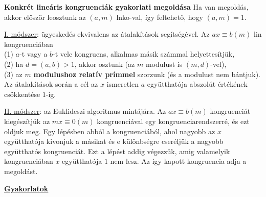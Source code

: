 \documentclass[a4paper, 12pt]{article}
\newcommand{\ul}{\underline}
\begin{document}
{\bf Konkrét lineáris kongruenciák gyakorlati megoldása} Ha van megoldás,
akkor először leosztunk az $(a,m)$ lnko-val, így feltehető, hogy $(a,m)=1$.

\ul{I. módszer}:
ügyeskedés ekvivalens az átalakítások segítségével. Az $ax\equiv b(m)$ lin
kongruenciában\\
(1) $a$-t vagy a $b$-t vele kongruens, alkalmas másik számmal helyettesítjük,\\
(2) ha $d=(a,b)>1$, akkor osztunk (az $m$ modulust is $(m,d)$-vel),\\
(3) az $m$ {\bf modulushoz relatív prímmel} szorzunk (és a
modulust nem bántjuk).\\
Az átalakítások során a cél az $x$ ismeretlen $a$
együtthatója abszolút értékének csökkentése $1$-ig.

\ul{II. módszer}: az Euklideszi algoritmus mintájára. Az $ax\equiv b(m)$
kongruenciát kiegészítjük az $mx\equiv 0(m)$ kongruenciával egy
kongruenciarendszerré, és ezt oldjuk meg. Egy lépésben abból a
kongruenciából, ahol nagyobb az $x$ együtthatója kivonjuk a másikat és e
különbségre cseréljük a nagyobb együtthatós kongruenciát. Ezt a lépést
addig végezzük, amig valamelyik kongruenciában $x$ együtthatója $1$ nem
lesz. Az így kapott kongruencia adja a megoldást.\\



\newpage





{\bf\large\underline{Gyakorlatok}}
\end{document}
